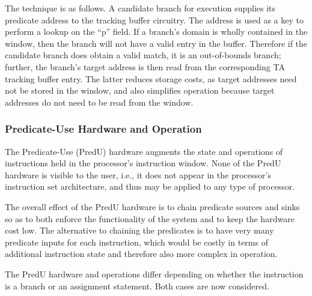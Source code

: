 \documentclass[10pt,dvips]{article}
\begin{document}
The technique is as follows. A candidate branch for execution supplies its
predicate address to the tracking buffer circuitry. The address is used
as a key
to perform a lookup on the ``p'' field.
If a branch's domain is wholly contained in the window, then the
branch will not have a valid entry in the buffer. Therefore if the candidate
branch does obtain a valid match, it is an out-of-bounds branch; further, the
branch's target address is then read from the corresponding TA tracking buffer
entry. The latter reduces storage costs, as target addresses need not be
stored in the window, and also simplifies operation because target addresses do
not need to be read from the window.

\subsubsection{Predicate-Use Hardware and Operation}
The Predicate-Use (PredU) hardware augments the state and operations of instructions
held in the processor's instruction window. None of the PredU hardware is visible
to the user, i.e., it does not appear in the processor's instruction set
architecture, and thus may be applied to any type of processor.

The overall effect of the PredU hardware is to chain predicate sources and sinks
so as to both enforce the functionality of the system and to keep the hardware
cost low. The alternative to chaining the predicates is to have very many predicate
inputs for each instruction, which would be costly in terms of additional
instruction state and therefore also more complex in operation.

The PredU hardware and operations differ depending on whether the instruction is
a branch or an assignment statement. Both cases are now considered.
\end{document}
